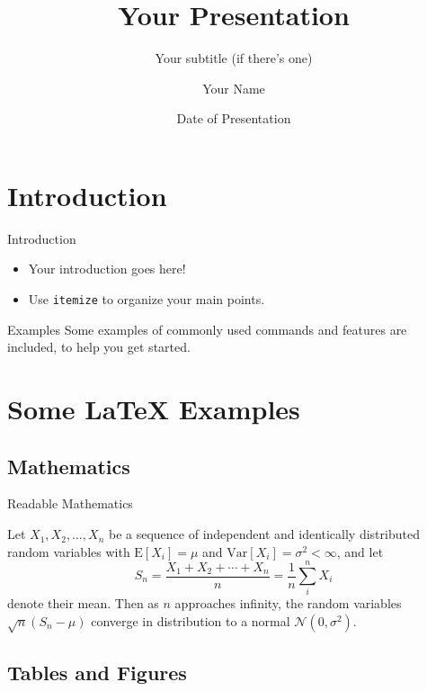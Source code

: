 \documentclass[10pt,xcolor={table,dvipsnames},t]{beamer}
\title[Your Short Title]{Your Presentation}
\subtitle{Your subtitle (if there's one)}
\author{Your Name}
\institute{Your Faculty/Department}
\date{Date of Presentation}
\begin{document}
\begin{frame}
  \titlepage
\end{frame}


\section{Introduction}

\begin{frame}{Introduction}

\begin{itemize}
  \item Your introduction goes here!
  \item Use \texttt{itemize} to organize your main points.
\end{itemize}

\begin{block}{Examples}
Some examples of commonly used commands and features are included, to help you get started.
\end{block}

\end{frame}

\section{Some \LaTeX{} Examples}

\subsection{Mathematics}

\begin{frame}{Readable Mathematics}

Let $X_1, X_2, \ldots, X_n$ be a sequence of independent and identically distributed random variables with $\text{E}[X_i] = \mu$ and $\text{Var}[X_i] = \sigma^2 < \infty$, and let
$$S_n = \frac{X_1 + X_2 + \cdots + X_n}{n}
      = \frac{1}{n}\sum_{i}^{n} X_i$$
denote their mean. Then as $n$ approaches infinity, the random variables $\sqrt{n}(S_n - \mu)$ converge in distribution to a normal $\mathcal{N}(0, \sigma^2)$.

\end{frame}


\subsection{Tables and Figures}
\end{document}

